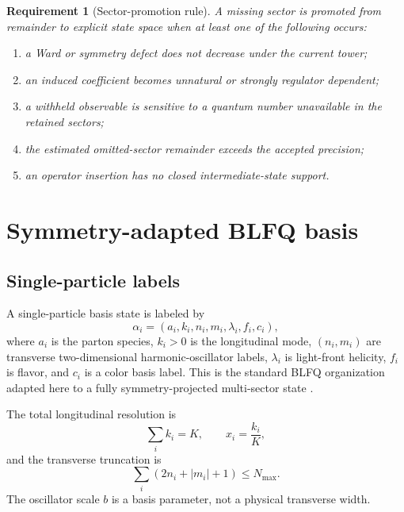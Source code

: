 \documentclass[11pt]{article}
\newtheorem{requirement}[definition]{Requirement}
\begin{document}
\begin{requirement}[Sector-promotion rule]
A missing sector is promoted from remainder to explicit state space when at
least one of the following occurs:
\begin{enumerate}
 \item a Ward or symmetry defect does not decrease under the current tower;
 \item an induced coefficient becomes unnatural or strongly regulator
 dependent;
 \item a withheld observable is sensitive to a quantum number unavailable in
 the retained sectors;
 \item the estimated omitted-sector remainder exceeds the accepted precision;
 \item an operator insertion has no closed intermediate-state support.
\end{enumerate}
\label{req:sector-promotion}
\end{requirement}

\section{Symmetry-adapted BLFQ basis}
\label{sec:basis}

\subsection{Single-particle labels}

A single-particle basis state is labeled by
\begin{equation}
 \alpha_i=
 \left(
 a_i,k_i,n_i,m_i,\lambda_i,f_i,c_i
 \right),
 \label{eq:single-particle-label}
\end{equation}
where \(a_i\) is the parton species, \(k_i>0\) is the longitudinal mode,
\((n_i,m_i)\) are transverse two-dimensional harmonic-oscillator labels,
\(\lambda_i\) is light-front helicity, \(f_i\) is flavor, and \(c_i\) is a
color basis label.  This is the standard BLFQ organization adapted here to a
fully symmetry-projected multi-sector state \cite{Vary2010,Zhao2014,Mondal2025}.

The total longitudinal resolution is
\begin{equation}
 \sum_i k_i=K,
 \qquad
 x_i=\frac{k_i}{K},
 \label{eq:longitudinal-K}
\end{equation}
and the transverse truncation is
\begin{equation}
 \sum_i\left(2n_i+|m_i|+1\right)\leq N_{\max}.
 \label{eq:nmax}
\end{equation}
The oscillator scale \(b\) is a basis parameter, not a physical transverse
width.
\end{document}
